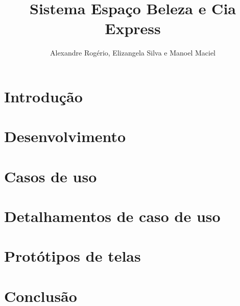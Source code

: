 \documentclass{article}
\begin{document}
	\title{\textbf{{\Huge Sistema Espaço Beleza e Cia Express}}}
	\author{Alexandre Rogério, Elizangela Silva e Manoel Maciel}
	\maketitle
	\thispagestyle{empty}
	\newpage
	
	\setcounter{page}{1}
	\tableofcontents
	\newpage
	
	\listoffigures
	\newpage
	
	\listoftables
	\newpage
	
	\setcounter{page}{1}
	
	\section{Introdução}
	
	\newpage
	\section{Desenvolvimento}
	
	\newpage
	\section{Casos de uso}
	
	\newpage
	\section{Detalhamentos de caso de uso}
	
	\newpage
	\section{Protótipos de telas}
	
	\newpage
	\section{Conclusão}
	
\end{document}
